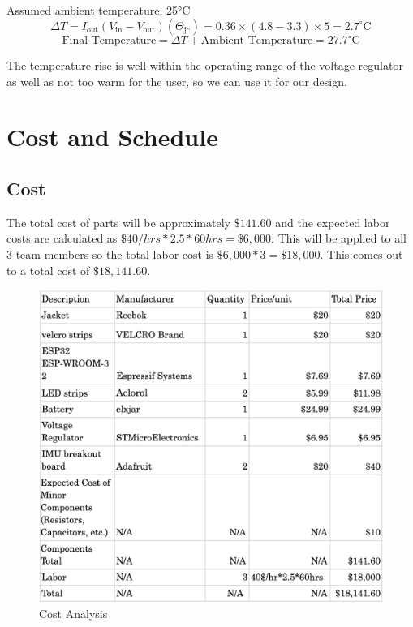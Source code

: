 \documentclass[12pt]{article}
\begin{document}
\noindent Assumed ambient temperature: 25°C 
\[
\Delta T = I_{\text{out}} (V_{\text{in}} - V_{\text{out}}) (\Theta_{\text{jc}}) = 0.36 \times (4.8 - 3.3) \times 5 = 2.7^\circ\text{C}
\]
\[
\text{Final Temperature} = \Delta T + \text{Ambient Temperature} = 27.7^\circ\text{C}
\]

\noindent The temperature rise is well within the operating range of the voltage regulator as well as not too warm for the user, so we can use it for our design.

\newpage
\section{Cost and Schedule}

\subsection{Cost}
The total cost of parts will be approximately $\$141.60$ and the expected labor costs are calculated as $\$40/hrs * 2.5 * 60 hrs = \$6,000$. This will be applied to all 3 team members so the total labor cost is $\$6,000 * 3 = \$18,000$. This comes out to a total cost of $\$18,141.60$.
\begin{figure}[ht]
    \centering
    \includegraphics[width=1\textwidth]{cost_analysis.png}
    \caption{Cost Analysis}
    \label{fig:my_label2}
\end{figure}
\end{document}
